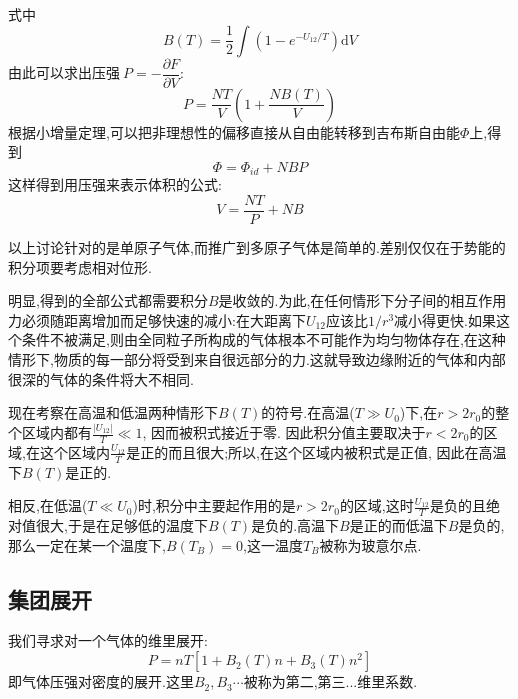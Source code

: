   式中 
  \begin{equation}
    B(T)=\frac{1}{2}\int(1-e^{-U_{12} / T})\mathrm{d} V \label{eq:5.6}
  \end{equation}
  由此可以求出压强$~P=-\dfrac{\partial F}{\partial V}$:
  \begin{equation}
    P=\dfrac{NT}{V}\left( 1+\dfrac{NB(T)}{V} \right) 
  \end{equation}
  根据小增量定理,可以把非理想性的偏移直接从自由能转移到吉布斯自由能$\Phi$上,得到 
  \[\Phi=\Phi_{id}+NBP\]
  这样得到用压强来表示体积的公式:
  \begin{equation}
    V=\dfrac{NT}{P}+NB 
  \end{equation}

  以上讨论针对的是单原子气体,而推广到多原子气体是简单的.差别仅仅在于势能的积分项要考虑相对位形.

  明显,得到的全部公式都需要积分$B$是收敛的.为此,在任何情形下分子间的相互作用力必须随距离增加而足够快速的减小:在大距离下$U_{12}$应该比$1 / r^{3}$减小得更快.如果这个条件不被满足,则由全同粒子所构成的气体根本不可能作为均匀物体存在,在这种情形下,物质的每一部分将受到来自很远部分的力.这就导致边缘附近的气体和内部很深的气体的条件将大不相同.

  现在考察在高温和低温两种情形下$B(T)$的符号.在高温($T\gg U_0$)下,在$r>2r_{0}$的整个区域内都有$\frac{\left\vert U_{12} \right\vert}{T}\ll 1$, 因而被积式接近于零. 因此积分值主要取决于$r<2r_0$的区域,在这个区域内$\frac{U_{12}}{T}$是正的而且很大;所以,在这个区域内被积式是正值, 因此在高温下$B(T)$是正的.

  相反,在低温($T\ll U_0$)时,积分中主要起作用的是$r>2r_0$的区域,这时$ \frac{U_{12}}{T}$是负的且绝对值很大,于是在足够低的温度下$B(T)$是负的.高温下$B$是正的而低温下$B$是负的, 那么一定在某一个温度下,$B(T_B)=0$,这一温度$T_B$被称为玻意尔点.

\subsection{集团展开}
  我们寻求对一个气体的维里展开:
  \begin{equation}
    P=nT\left[ 1+B_2(T)n+B_3(T)n^{2} \right] 
  \end{equation}
  即气体压强对密度的展开.这里$B_2,B_3 \cdots$被称为第二,第三...维里系数.

